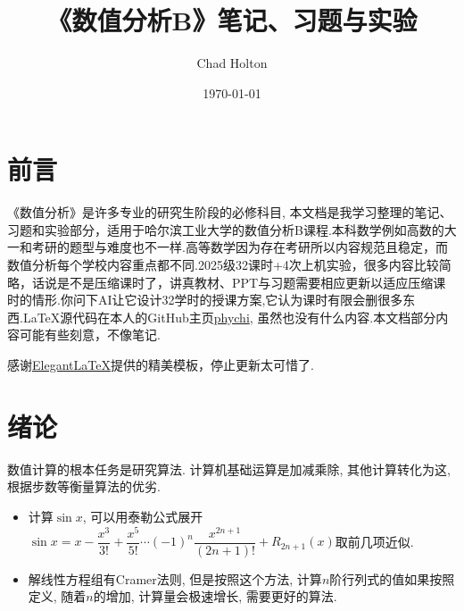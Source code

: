 \documentclass[lang=cn,newtx,12pt,scheme=chinese]{elegantbook}
\title{《数值分析B》笔记、习题与实验}
\author{Chad Holton}
\institute{哈尔滨工业大学能源科学与工程学院}
\date{\today}
\begin{document}
\maketitle
\frontmatter

\tableofcontents

\mainmatter
\chapter*{前言}
《数值分析》是许多专业的研究生阶段的必修科目, 本文档是我学习整理的笔记、习题和实验部分，适用于哈尔滨工业大学的数值分析B课程.本科数学例如高数的大一和考研的题型与难度也不一样.高等数学因为存在考研所以内容规范且稳定，而数值分析每个学校内容重点都不同.2025级32课时+4次上机实验，很多内容比较简略，话说是不是压缩课时了，讲真教材、PPT与习题需要相应更新以适应压缩课时的情形.你问下AI让它设计32学时的授课方案,它认为课时有限会删很多东西.\LaTeX 源代码在本人的GitHub主页\href{https://github.com/phychi}{phychi}, 虽然也没有什么内容.本文档部分内容可能有些刻意，不像笔记.

感谢\href{https://github.com/ElegantLaTeX}{ElegantLaTeX}提供的精美模板，停止更新太可惜了.
\chapter{绪论}
数值计算的根本任务是研究算法. 计算机基础运算是加减乘除, 其他计算转化为这, 根据步数等衡量算法的优劣.
\begin{itemize}
	\item 计算$\sin x$, 可以用泰勒公式展开$\sin x=x-\dfrac{x^3}{3!}+\dfrac{x^5}{5!}\cdots(-1)^n\dfrac{x^{2n+1}}{(2n+1)!}+R_{2n+1}(x)$取前几项近似.
	\item 解线性方程组有Cramer法则, 但是按照这个方法, 计算$n$阶行列式的值如果按照定义, 随着$n$的增加, 计算量会极速增长, 需要更好的算法.
\end{itemize}
\end{document}
